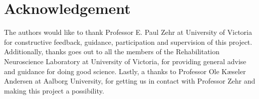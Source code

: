 \section*{Acknowledgement} 

The authors would like to thank Professor E. Paul Zehr at University of Victoria for constructive feedback, guidance, participation and supervision of this project. Additionally, thanks goes out to all the members of the Rehabilitation Neuroscience Laboratory at University of Victoria, for providing general advise and guidance for doing good science. Lastly, a thanks to Professor Ole Kæseler Andersen at Aalborg University, for getting us in contact with Professor Zehr and making this project a possibility. 